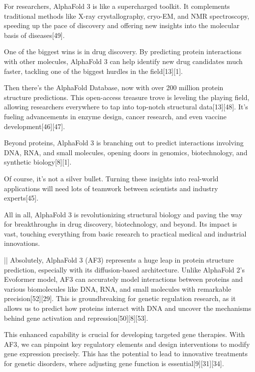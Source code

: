 \documentclass[11pt]{article}
\begin{document}
\begin{showcase}[title=Topic: AlphaFold 3]
For researchers, AlphaFold 3 is like a supercharged toolkit. It complements traditional methods like X-ray crystallography, cryo-EM, and NMR spectroscopy, speeding up the pace of discovery and offering new insights into the molecular basis of diseases[49]. 

One of the biggest wins is in drug discovery. By predicting protein interactions with other molecules, AlphaFold 3 can help identify new drug candidates much faster, tackling one of the biggest hurdles in the field[13][1].

Then there's the AlphaFold Database, now with over 200 million protein structure predictions. This open-access treasure trove is leveling the playing field, allowing researchers everywhere to tap into top-notch structural data[13][48]. It's fueling advancements in enzyme design, cancer research, and even vaccine development[46][47].

Beyond proteins, AlphaFold 3 is branching out to predict interactions involving DNA, RNA, and small molecules, opening doors in genomics, biotechnology, and synthetic biology[8][1].

Of course, it's not a silver bullet. Turning these insights into real-world applications will need lots of teamwork between scientists and industry experts[45].

All in all, AlphaFold 3 is revolutionizing structural biology and paving the way for breakthroughs in drug discovery, biotechnology, and beyond. Its impact is vast, touching everything from basic research to practical medical and industrial innovations.

||
Absolutely, AlphaFold 3 (AF3) represents a huge leap in protein structure prediction, especially with its diffusion-based architecture. Unlike AlphaFold 2's Evoformer model, AF3 can accurately model interactions between proteins and various biomolecules like DNA, RNA, and small molecules with remarkable precision[52][29]. This is groundbreaking for genetic regulation research, as it allows us to predict how proteins interact with DNA and uncover the mechanisms behind gene activation and repression[50][8][53].

This enhanced capability is crucial for developing targeted gene therapies. With AF3, we can pinpoint key regulatory elements and design interventions to modify gene expression precisely. This has the potential to lead to innovative treatments for genetic disorders, where adjusting gene function is essential[9][31][34].


\end{showcase}
\end{document}
